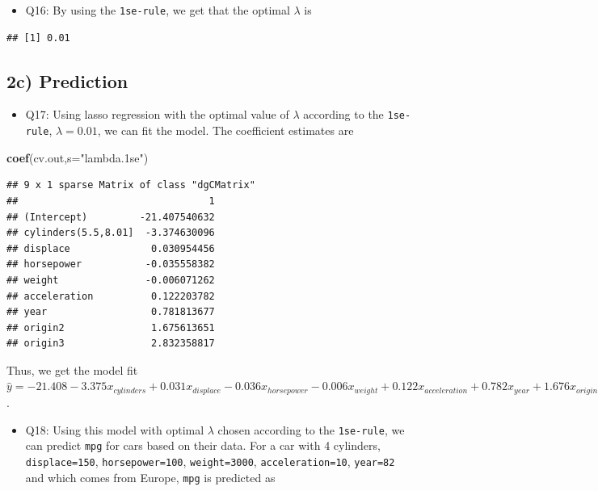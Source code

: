 \documentclass[]{article}
\newenvironment{Shaded}{\begin{snugshade}}{\end{snugshade}}
\newcommand{\KeywordTok}[1]{\textcolor[rgb]{0.13,0.29,0.53}{\textbf{#1}}}
\newcommand{\DataTypeTok}[1]{\textcolor[rgb]{0.13,0.29,0.53}{#1}}
\newcommand{\StringTok}[1]{\textcolor[rgb]{0.31,0.60,0.02}{#1}}
\newcommand{\OperatorTok}[1]{\textcolor[rgb]{0.81,0.36,0.00}{\textbf{#1}}}
\newcommand{\NormalTok}[1]{#1}
\providecommand{\tightlist}{%
  \setlength{\itemsep}{0pt}\setlength{\parskip}{0pt}}
\begin{document}
\begin{itemize}
\tightlist
\item
  Q16: By using the \texttt{1se-rule}, we get that the optimal
  \(\lambda\) is
\end{itemize}

\begin{Shaded}
\end{Shaded}

\begin{verbatim}
## [1] 0.01
\end{verbatim}

\subsection{2c) Prediction}\label{c-prediction}

\begin{itemize}
\tightlist
\item
  Q17: Using lasso regression with the optimal value of \(\lambda\)
  according to the \texttt{1se-rule}, \(\lambda=0.01\), we can fit the
  model. The coefficient estimates are
\end{itemize}

\begin{Shaded}
\begin{Highlighting}[]
\KeywordTok{coef}\NormalTok{(cv.out,}\DataTypeTok{s=}\StringTok{"lambda.1se"}\NormalTok{)}
\end{Highlighting}
\end{Shaded}

\begin{verbatim}
## 9 x 1 sparse Matrix of class "dgCMatrix"
##                                 1
## (Intercept)         -21.407540632
## cylinders(5.5,8.01]  -3.374630096
## displace              0.030954456
## horsepower           -0.035558382
## weight               -0.006071262
## acceleration          0.122203782
## year                  0.781813677
## origin2               1.675613651
## origin3               2.832358817
\end{verbatim}

Thus, we get the model fit
\(\hat{y}=-21.408-3.375x_{cylinders}+0.031x_{displace}-0.036x_{horsepower}-0.006x_{weight}+0.122x_{acceleration}+0.782x_{year}+1.676x_{origin2}+2.832x_{origin3}\).

\begin{itemize}
\tightlist
\item
  Q18: Using this model with optimal \(\lambda\) chosen according to the
  \texttt{1se-rule}, we can predict \texttt{mpg} for cars based on their
  data. For a car with 4 cylinders, \texttt{displace=150},
  \texttt{horsepower=100}, \texttt{weight=3000},
  \texttt{acceleration=10}, \texttt{year=82} and which comes from
  Europe, \texttt{mpg} is predicted as
\end{itemize}
\end{document}
